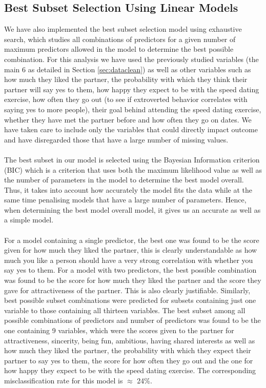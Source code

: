 \documentclass{article}
\begin{document}
\subsection{Best Subset Selection Using Linear Models}
We have also implemented the best subset selection model using exhaustive search, which studies all combinations of predictors for a given number of maximum predictors allowed in the model to determine the best possible combination. For this analysis we have used the previously studied variables (the main 6 as detailed in Section \ref{sec:dataclean}) as well as other variables such as how much they liked the partner, the probability with which they think their partner will say yes to them, how happy they expect to be with the speed dating exercise, how often they go out (to see if extroverted behavior correlates with saying yes to more people), their goal behind attending the speed dating exercise, whether they have met the partner before and how often they go on dates. We have taken care to include only the variables that could directly impact outcome and have disregarded those that have a large number of missing values. \\
\null\\
The best subset in our model is selected using the Bayesian Information criterion (BIC) which is a criterion that uses both the maximum likelihood value as well as the number of parameters in the model to determine the best model overall. Thus, it takes into account how accurately the model fits the data while at the same time penalising models that have a large number of parameters. Hence, when determining the best model overall model, it gives us an accurate as well as a simple model.\\
\null\\
For a model containing a single predictor, the best one was found to be the score given for how much they liked the partner, this is clearly understandable as how much you like a person should have a very strong correlation with whether you say yes to them. For a model with two predictors, the best possible combination was found to be the score for how much they liked the partner and the score they gave for attractiveness of the partner. This is also clearly justifiable. Similarly, best possible subset combinations were predicted for subsets containing just one variable to those containing all thirteen variables. The best subset among all possible combinations of predictors and number of predictors was found to be the one containing 9 variables, which were the scores given to the partner for attractiveness, sincerity, being fun, ambitious, having shared interests as well as how much they liked the partner, the probability with which they expect their partner to say yes to them, the score for how often they go out and the one for how happy they expect to be with the speed dating exercise.  The corresponding misclassification rate for this model is $\approx$ 24\%.\\
\end{document}
